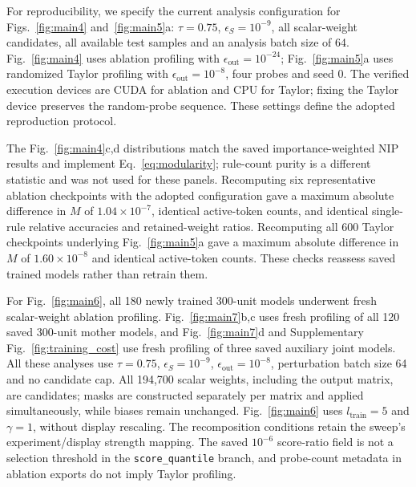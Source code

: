 \documentclass{article}
\begin{document}
For reproducibility, we specify the current analysis configuration for Figs.~\ref{fig:main4} and~\ref{fig:main5}a: $\tau=0.75$, $\epsilon_S=10^{-9}$, all scalar-weight candidates, all available test samples and an analysis batch size of 64. Fig.~\ref{fig:main4} uses ablation profiling with $\epsilon_{\mathrm{out}}=10^{-24}$; Fig.~\ref{fig:main5}a uses randomized Taylor profiling with $\epsilon_{\mathrm{out}}=10^{-8}$, four probes and seed 0. The verified execution devices are CUDA for ablation and CPU for Taylor; fixing the Taylor device preserves the random-probe sequence. These settings define the adopted reproduction protocol.

The Fig.~\ref{fig:main4}c,d distributions match the saved importance-weighted NIP results and implement Eq.~\eqref{eq:modularity}; rule-count purity is a different statistic and was not used for these panels. Recomputing six representative ablation checkpoints with the adopted configuration gave a maximum absolute difference in $M$ of $1.04\times10^{-7}$, identical active-token counts, and identical single-rule relative accuracies and retained-weight ratios. Recomputing all 600 Taylor checkpoints underlying Fig.~\ref{fig:main5}a gave a maximum absolute difference in $M$ of $1.60\times10^{-8}$ and identical active-token counts. These checks reassess saved trained models rather than retrain them.

For Fig.~\ref{fig:main6}, all 180 newly trained 300-unit models underwent fresh scalar-weight ablation profiling. Fig.~\ref{fig:main7}b,c uses fresh profiling of all 120 saved 300-unit mother models, and Fig.~\ref{fig:main7}d and Supplementary Fig.~\ref{fig:training_cost} use fresh profiling of three saved auxiliary joint models. All these analyses use $\tau=0.75$, $\epsilon_S=10^{-9}$, $\epsilon_{\mathrm{out}}=10^{-8}$, perturbation batch size 64 and no candidate cap. All 194,700 scalar weights, including the output matrix, are candidates; masks are constructed separately per matrix and applied simultaneously, while biases remain unchanged. Fig.~\ref{fig:main6} uses $l_{\mathrm{train}}=5$ and $\gamma=1$, without display rescaling. The recomposition conditions retain the sweep's experiment/display strength mapping. The saved $10^{-6}$ score-ratio field is not a selection threshold in the \texttt{score\_quantile} branch, and probe-count metadata in ablation exports do not imply Taylor profiling.
\end{document}
